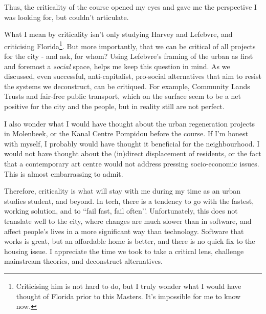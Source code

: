 \documentclass[12pt]{article}
\begin{document}
Thus, the criticality of the course opened my eyes and gave me the perspective I was looking for, but couldn’t articulate. 

What I mean by criticality isn’t only studying Harvey and Lefebvre, and criticising Florida\footnote{Criticising him is not hard to do, but I truly wonder what I would have thought of Florida prior to this Masters. It’s impossible for me to know now.}. But more importantly, that we can be critical of all projects for the city - and ask, for whom? Using Lefebvre’s framing of the urban as first and foremost a \textit{social} space, helps me keep this question in mind.
As we discussed, even successful, anti-capitalist, pro-social alternatives that aim to resist the systems we deconstruct, can be critiqued. For example, Community Lands Trusts and fair-free public transport, which on the surface seem to be a net positive for the city and the people, but in reality still are not perfect.

I also wonder what I would have thought about the urban regeneration projects in Molenbeek, or the Kanal Centre Pompidou before the course. If I’m honest with myself, I probably would have thought it beneficial for the neighbourhood. I would not have thought about the (in)direct displacement of residents, or the fact that a contemporary art centre would not address pressing socio-economic issues. This is almost embarrassing to admit. 

Therefore, criticality is what will stay with me during my time as an urban studies student, and beyond. In tech, there is a tendency to go with the fastest, working solution, and to ``fail fast, fail often’’. Unfortunately, this does not translate well to the city, where changes are much slower than in software, and affect people’s lives in a more significant way than technology. Software that works is great, but an affordable home is better, and there is no quick fix to the housing issue.
I appreciate the time we took to take a critical lens, challenge mainstream theories, and deconstruct alternatives.

\printbibliography 
\end{document}
